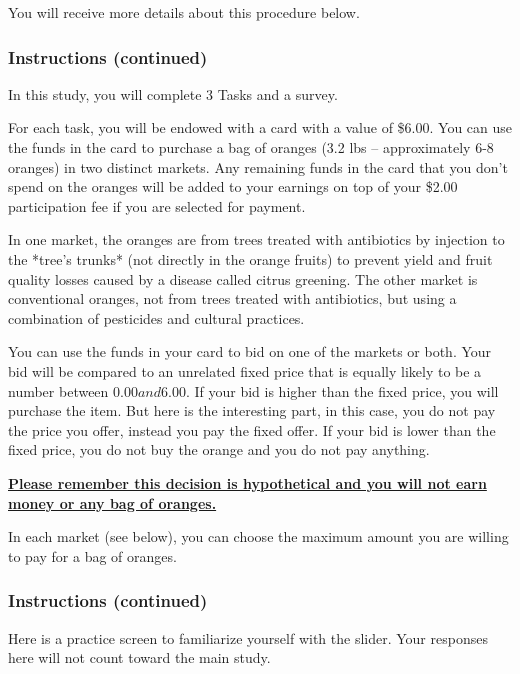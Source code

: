 \documentclass[12pt]{article}
\begin{document}
You will receive more details about this procedure below.

\clearpage



\subsubsection*{Instructions (continued)}

In this study, you will complete 3 Tasks and a survey.

For each task, you will be endowed with a card with a value of \$6.00. You can use the funds in the card to purchase a bag of oranges (3.2 lbs – approximately 6-8 oranges) in two distinct markets. Any remaining funds in the card that you don’t spend on the oranges will be added to your earnings on top of your \$2.00 participation fee if you are selected for payment.



In one market, the oranges are from trees treated with antibiotics by injection to the *tree’s trunks* (not directly in the orange fruits) to prevent yield and fruit quality losses caused by a disease called citrus greening. The other market is conventional oranges, not from trees treated with antibiotics, but using a combination of pesticides and cultural practices.

You can use the funds in your card to bid on one of the markets or both. Your bid will be compared to an unrelated fixed price that is equally likely to be a number between $0.00 and $6.00. If your bid is higher than the fixed price, you will purchase the item. But here is the interesting part, in this case, you do not pay the price you offer, instead you pay the fixed offer. If your bid is lower than the fixed price, you do not buy the orange and you do not pay anything. 

\vspace{0.5cm}

{\textbf{\uline{Please remember this decision is hypothetical
and you will not earn money  or any bag of oranges.}}}



In each market (see below), you can choose the maximum amount you are willing to pay for a bag of oranges.
\clearpage

\subsubsection{\textbf{Instructions (continued)}}
 Here is a practice screen to familiarize yourself with the slider. Your responses here will not count toward the main study.
\end{document}
